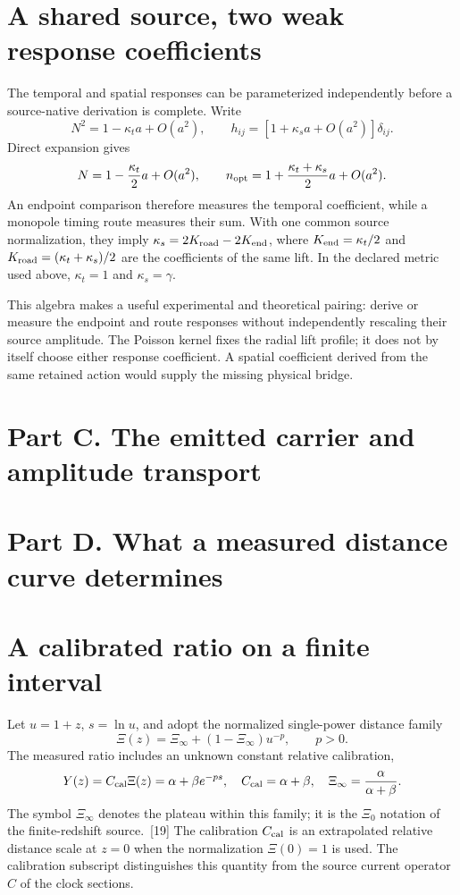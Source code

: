 \documentclass[10pt,twocolumn,letterpaper]{article}
\begin{document}
\section{A shared source, two weak response coefficients}
The temporal and spatial responses can be parameterized independently before a source-native derivation is complete. Write
\[
 N^2=1-\kappa_t a+O(a^2),\qquad
 h_{ij}=[1+\kappa_s a+O(a^2)]\delta_{ij}.
\]
Direct expansion gives
\[
 N=1-\frac{\kappa_t}{2}a+O(a^2),\qquad
 n_{\rm opt}=1+\frac{\kappa_t+\kappa_s}{2}a+O(a^2).
\]
An endpoint comparison therefore measures the temporal coefficient, while a monopole timing route measures their sum. With one common source normalization, they imply $\kappa_s=2K_{\rm road}-2K_{\rm end}$, where $K_{\rm end}=\kappa_t/2$ and $K_{\rm road}=(\kappa_t+\kappa_s)/2$ are the coefficients of the same lift. In the declared metric used above, $\kappa_t=1$ and $\kappa_s=\gamma$.

This algebra makes a useful experimental and theoretical pairing: derive or measure the endpoint and route responses without independently rescaling their source amplitude. The Poisson kernel fixes the radial lift profile; it does not by itself choose either response coefficient. A spatial coefficient derived from the same retained action would supply the missing physical bridge.

\section*{Part C. The emitted carrier and amplitude transport}




\section*{Part D. What a measured distance curve determines}
\section{A calibrated ratio on a finite interval}
Let $u=1+z$, $s=\ln u$, and adopt the normalized single-power distance family
\[
 \Xi(z)=\Xi_\infty+(1-\Xi_\infty)u^{-p},\qquad p>0.
\]
The measured ratio includes an unknown constant relative calibration,
\begin{equation}
 Y(z)=C_{\rm cal}\Xi(z)=\alpha+\beta e^{-ps},\quad
 C_{\rm cal}=\alpha+\beta,\quad
 \Xi_\infty=\frac{\alpha}{\alpha+\beta}.
 \label{eq:single-power}
\end{equation}
The symbol $\Xi_\infty$ denotes the plateau within this family; it is the $\Xi_0$ notation of the finite-redshift source.~[19] The calibration $C_{\rm cal}$ is an extrapolated relative distance scale at $z=0$ when the normalization $\Xi(0)=1$ is used. The calibration subscript distinguishes this quantity from the source current operator $C$ of the clock sections.
\end{document}
